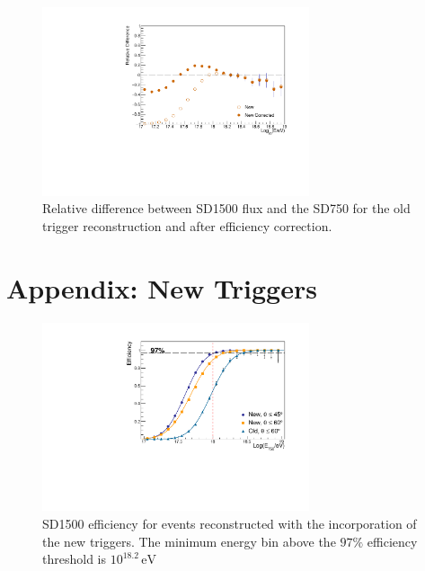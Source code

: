 \documentclass[12pt,a4paper]{article}
\newcommand{\eV}{\, \mathrm{eV}}
\begin{document}
\begin{figure}[h]
    \begin{center}
        \includegraphics[width=0.7\textwidth]{plots/NewDifference.pdf}
        \caption{Relative difference between SD1500 flux and the SD750 for the old trigger reconstruction and after efficiency correction.
        \label{fig:difference}}
    \end{center}
\end{figure} 


\section*{Appendix: New Triggers}

\begin{figure}[h]
    \begin{center}
        \includegraphics[width=0.7\textwidth]{plots/NewCut.pdf}  
        \caption{SD1500 efficiency for events reconstructed with the incorporation of the new triggers. The minimum energy bin above the $97\%$ efficiency threshold is $10^{18.2}\eV$
        \label{fig:allZenithNew}}
    \end{center}
\end{figure}
\end{document}
